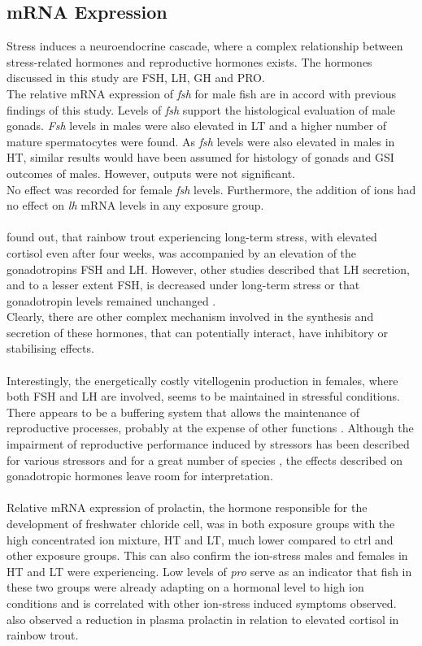 \documentclass[twoside]{article}
\begin{document}
\begin{multicols}{2}
\subsection*{mRNA Expression}
Stress induces a neuroendocrine cascade, where a complex relationship between stress-related hormones and reproductive hormones exists. The hormones discussed in this study are FSH, LH, GH and PRO. \\
The relative mRNA expression of \textit{fsh} for male fish are in accord with previous findings of this study. Levels of \textit{fsh} support the histological evaluation of male gonads. \textit{Fsh}  levels in males were also elevated in LT and a higher number of mature spermatocytes were found. As \textit{fsh} levels were also elevated in males in HT, similar results would have been assumed for histology of gonads and GSI outcomes of males. However,  outputs were not significant. \\
No effect was recorded for female \textit{fsh} levels. Furthermore, the addition of ions had no effect on \textit{lh} mRNA levels in any exposure group. \\ \\ 
\cite{pickering1987} found out, that rainbow trout experiencing long-term stress, with elevated cortisol even after four weeks, was accompanied by an elevation of the gonadotropins FSH and LH. However, other studies described that LH secretion, and to a lesser extent FSH, is decreased under long-term stress \citep{krulich1974,gray1978} or that gonadotropin levels remained unchanged \citep{billard1981}. \\ Clearly, there are other complex mechanism involved in the synthesis and secretion of these hormones, that can potentially interact, have inhibitory or stabilising effects. \\ \\ 
Interestingly, the energetically costly vitellogenin production in females, where both FSH and LH are involved, seems to be maintained in stressful conditions. There appears to be a buffering system that allows the maintenance of reproductive processes, probably at the expense of other functions \citep{schwindt2007}. Although the impairment of reproductive performance induced by stressors has been described for various stressors and for a great number of species \citep{krulich1974,gray1978,billard1981}, the effects described on gonadotropic hormones leave room for interpretation.  
\\ \\
Relative mRNA expression of prolactin, the hormone responsible for the development of freshwater chloride cell, was in both exposure groups with the high concentrated ion mixture, HT and LT, much lower compared to ctrl and other exposure groups. This can also confirm the ion-stress males and females in HT and LT were experiencing. Low levels of \textit{pro} serve as an indicator that fish in these two groups were already adapting on a hormonal level to high ion conditions and is correlated with other ion-stress induced symptoms observed. \cite{pottinger1992} also observed a reduction in plasma prolactin in relation to elevated cortisol in rainbow trout. \\ \\ 

\end{multicols}
\end{document}
